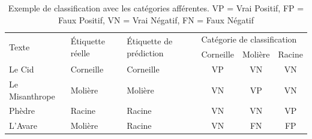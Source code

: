 \begin{table}[h]
\centering
\begin{tabular}{lllccc}
\toprule
\multirow{2}{*}{Texte} & \multirow{2}{*}{Étiquette réelle}& \multirow{2}{*}{Étiquette de prédiction} & \multicolumn{3}{l}{Catégorie de classification} \\
                       &                         &                             & Corneille        & Molière       & Racine       \\ \midrule
Le Cid                 & Corneille               & Corneille                   & VP               & VN            & VN           \\
Le Misanthrope         & Molière                 & Molière                     & VN               & VP            & VN           \\
Phèdre                 & Racine                  & Racine                      & VN               & VN            & VP           \\
L'Avare                & Molière                 & Racine                      & VN               & FN            & FP          \\ \bottomrule
\end{tabular}
\caption{Exemple de classification avec les catégories afférentes. VP = Vrai Positif, FP = Faux Positif, VN = Vrai Négatif, FN = Faux Négatif}
\label{deep-learning:table:true-positives}
\end{table}

